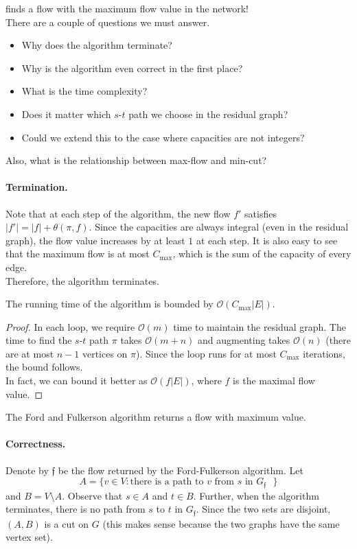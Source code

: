	 finds a flow with the maximum flow value in the network!\\
	There are a couple of questions we must answer.
	\begin{itemize}
		\item Why does the algorithm terminate?
		\item Why is the algorithm even correct in the first place?
		\item What is the time complexity?
		\item Does it matter which $s$-$t$ path we choose in the residual graph?
		\item Could we extend this to the case where capacities are not integers?
	\end{itemize}

	Also, what is the relationship between max-flow and min-cut?

	\paragraph{Termination.} Note that at each step of the algorithm, the new flow $f'$ satisfies $|f'|=|f|+\theta(\pi,f)$. Since the capacities are always integral (even in the residual graph), the flow value increases by at least $1$ at each step. It is also easy to see that the maximum flow is at most $C_{\text{max}}$, which is the sum of the capacity of every edge.\\
	Therefore, the algorithm terminates.

	\begin{lemma}
		The running time of the algorithm is bounded by $\mathcal{O}(C_{\text{max}}|E|)$.
	\end{lemma}
	\begin{proof}
		In each loop, we require $\mathcal{O}(m)$ time to maintain the residual graph. The time to find the $s$-$t$ path $\pi$ takes $\mathcal{O}(m+n)$ and augmenting takes $\mathcal{O}(n)$ (there are at most $n-1$ vertices on $\pi$). Since the loop runs for at most $C_{\text{max}}$ iterations, the bound follows.\\
		In fact, we can bound it better as $\mathcal{O}(f|E|)$, where $f$ is the maximal flow value.
	\end{proof}

	\begin{lemma}
		The Ford and Fulkerson algorithm returns a flow with maximum value.
	\end{lemma}

	\paragraph{Correctness.} Denote by $\mathfrak{f}$ be the flow returned by the Ford-Fulkerson algorithm. Let
	\[ A = \{v\in V : \text{there is a path to $v$ from $s$ in $G_{\mathfrak{f}}$ }\} \]
	and $B=V\setminus A$. Observe that $s\in A$ and $t\in B$. Further, when the algorithm terminates, there is no path from $s$ to $t$ in $G_\mathfrak{f}$. Since the two sets are disjoint, $(A,B)$ is a cut on $G$ (this makes sense because the two graphs have the same vertex set).

